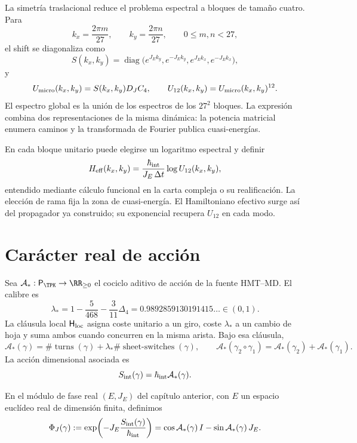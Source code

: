 La simetría traslacional reduce el problema espectral a bloques de tamaño
cuatro. Para
\[
 k_x=\frac{2\pi m}{27},\qquad
 k_y=\frac{2\pi n}{27},
 \qquad 0\le m,n<27,
\]
el shift se diagonaliza como
\[
 S(k_x,k_y)=\operatorname{diag}
 \bigl(e^{J_Ek_y},e^{-J_Ek_y},e^{J_Ek_x},e^{-J_Ek_x}\bigr),
\]
y
\begin{equation}
 U_{\rm micro}(k_x,k_y)=S(k_x,k_y)D_JC_4,
 \qquad
 U_{12}(k_x,k_y)=U_{\rm micro}(k_x,k_y)^{12}.
 \label{eq:bloque-fourier-ledger-27}
\end{equation}
El espectro global es la unión de los espectros de los \(27^2\) bloques.
La expresión combina dos representaciones de la misma dinámica: la potencia
matricial enumera caminos y la transformada de Fourier publica
cuasi-energías.

En cada bloque unitario puede elegirse un logaritmo espectral y definir
\[
 H_{\rm eff}(k_x,k_y)
 =\frac{\hbar_{\rm int}}{J_E\,\Delta t}
   \log U_{12}(k_x,k_y),
\]
entendido mediante cálculo funcional en la carta compleja o su realificación.
La elección de rama fija la zona de cuasi-energía. El Hamiltoniano efectivo
surge así del propagador ya construido; su exponencial recupera
\(U_{12}\) en cada modo.

\section{Carácter real de acción}

Sea \(\mathcal A_*:\mathsf P_{\TPK}\to\RR_{\geq0}\) el cociclo aditivo de
acción de la fuente HMT--MD. El calibre es
\[
 \lambda_*
 =1-\frac5{468}-\frac3{11}\Delta_4
 =0.9892859130191415\ldots\in(0,1).
\]
La cláusula local \(\mathsf H_{\rm loc}\) asigna coste unitario a un giro,
coste \(\lambda_*\) a un cambio de hoja y suma ambos cuando concurren en la
misma arista. Bajo esa cláusula,
\[
 \mathcal A_*(\gamma)
 =\#\operatorname{turns}(\gamma)
  +\lambda_*\#\operatorname{sheet\mbox{-}switches}(\gamma),
\qquad
 \mathcal A_*(\gamma_2\circ\gamma_1)
 =\mathcal A_*(\gamma_2)+\mathcal A_*(\gamma_1).
\]
La acción dimensional asociada es
\[
 S_{\rm int}(\gamma)=\hbar_{\rm int}\mathcal A_*(\gamma).
\]

En el módulo de fase real \((E,J_E)\) del capítulo anterior, con \(E\) un
espacio euclídeo real de dimensión finita, definimos
\begin{equation}
 \Phi_J(\gamma)
 :=\exp\!\left(-J_E\frac{S_{\rm int}(\gamma)}{\hbar_{\rm int}}\right)
 =\cos\mathcal A_*(\gamma)\,I
  -\sin\mathcal A_*(\gamma)\,J_E.
 \label{eq:caracter-real-accion}
\end{equation}

